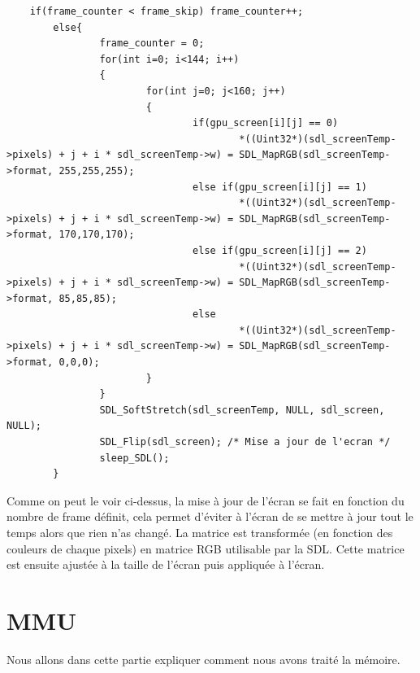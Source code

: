 \documentclass{report}
\begin{document}
\begin{lstlisting}
	if(frame_counter < frame_skip) frame_counter++;
        else{
                frame_counter = 0;
                for(int i=0; i<144; i++)
                {
                        for(int j=0; j<160; j++)
                        {
                                if(gpu_screen[i][j] == 0)
                                        *((Uint32*)(sdl_screenTemp->pixels) + j + i * sdl_screenTemp->w) = SDL_MapRGB(sdl_screenTemp->format, 255,255,255);
                                else if(gpu_screen[i][j] == 1)
                                        *((Uint32*)(sdl_screenTemp->pixels) + j + i * sdl_screenTemp->w) = SDL_MapRGB(sdl_screenTemp->format, 170,170,170);
                                else if(gpu_screen[i][j] == 2)
                                        *((Uint32*)(sdl_screenTemp->pixels) + j + i * sdl_screenTemp->w) = SDL_MapRGB(sdl_screenTemp->format, 85,85,85);
                                else
                                        *((Uint32*)(sdl_screenTemp->pixels) + j + i * sdl_screenTemp->w) = SDL_MapRGB(sdl_screenTemp->format, 0,0,0);
                        }
                }
                SDL_SoftStretch(sdl_screenTemp, NULL, sdl_screen, NULL);
                SDL_Flip(sdl_screen); /* Mise a jour de l'ecran */
                sleep_SDL();
        }

\end{lstlisting}
Comme on peut le voir ci-dessus, la mise à jour de l'écran se fait en fonction du nombre de frame définit, cela permet d'éviter à l'écran de se mettre à jour tout le temps alors que rien n'as changé. La matrice est transformée (en fonction des couleurs de chaque pixels) en matrice RGB utilisable par la SDL. Cette matrice est ensuite ajustée à la taille de l'écran puis appliquée à l'écran.\\

\section{MMU}
Nous allons dans cette partie expliquer comment nous avons traité la mémoire. 
\end{document}
